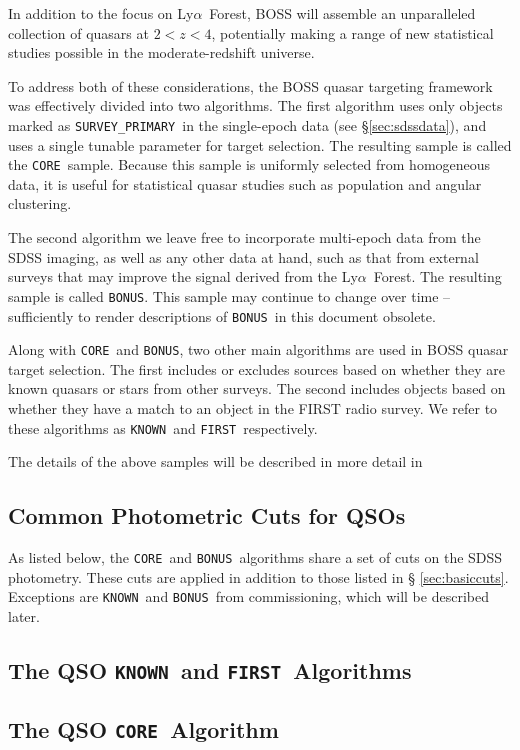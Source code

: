 \documentclass[12pt,preprint]{aastex}
\newcommand{\Lyaf}{Ly$\alpha$~Forest}
\newcommand{\core}{\texttt{CORE}}
\newcommand{\bonus}{\texttt{BONUS}}
\newcommand{\primary}{\texttt{SURVEY\_PRIMARY}}
\newcommand{\known}{\texttt{KNOWN}}
\newcommand{\first}{\texttt{FIRST}}
\begin{document}
In addition to the focus on \Lyaf, BOSS will assemble an unparalleled
collection of quasars at $2 < z < 4$, potentially making a range of new
statistical studies possible in the moderate-redshift universe.

To address both of these considerations, the BOSS quasar targeting
framework was effectively divided into two algorithms. The first
algorithm uses only objects marked as \primary\ in the single-epoch
data (see \S \ref{sec:sdssdata}), and uses a single tunable parameter
for target selection. The resulting sample is called the \core\ sample.
Because this sample is uniformly selected from homogeneous data, it is
useful for statistical quasar studies such as population and angular
clustering.

The second algorithm we leave free to incorporate multi-epoch data from 
the SDSS imaging, as well as any other data at hand, such as that
from external surveys that may improve the signal derived from
the \Lyaf.  The resulting sample is called \bonus.  This sample
may continue to change over time -- sufficiently to render 
descriptions of \bonus\ in this document obsolete.

Along with \core\ and \bonus, two other main algorithms are used in BOSS
quasar target selection. The first includes or excludes sources based on
whether they are known quasars or stars from other surveys. The second
includes objects based on whether they have a match to an object in the
FIRST radio survey. We refer to these algorithms as \known\ and \first\
respectively.  

The details of the above samples will be described in more detail in


\subsection{Common Photometric Cuts for QSOs}

As listed below, the \core\ and \bonus\ algorithms share a set of cuts on the
SDSS photometry. These cuts are applied in addition to those listed in \S
\ref{sec:basiccuts}. Exceptions are \known\ and \bonus\ from commissioning,
which will be described later.


\subsection{The QSO \known\ and \first\ Algorithms} \label{sec:knownfirst}

\subsection{The QSO \core\ Algorithm}
\end{document}
